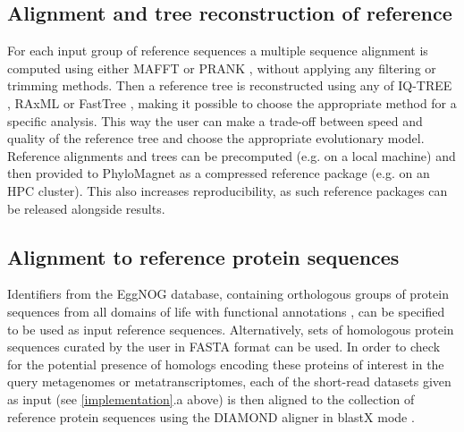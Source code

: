 \documentclass[a4paper]{article}
\begin{document}
\subsection{Alignment and tree reconstruction of reference}
For each input group of reference sequences a multiple sequence alignment is computed using either MAFFT \citep{Katoh2013} or PRANK \citep{Loytynoja2010}, without applying any filtering or trimming methods. Then a reference tree is reconstructed using any of IQ-TREE \citep{Nguyen2015}, RAxML \citep{Stamatakis2014} or FastTree \citep{Price2010}, making it possible to choose the appropriate method for a specific analysis. This way the user can make a trade-off between speed and quality of the reference tree and choose the appropriate evolutionary model. Reference alignments and trees can be precomputed (e.g. on a local machine) and then provided to PhyloMagnet as a compressed reference package (e.g. on an HPC cluster). This also increases reproducibility, as such reference packages can be released alongside results.

\subsection{Alignment to reference protein sequences}
Identifiers from the EggNOG database, containing orthologous groups of protein sequences from all domains of life with functional annotations \citep{Huerta-cepas2016b}, can be specified to be used as input reference sequences. Alternatively, sets of homologous protein sequences curated by the user in FASTA format can be used. In order to check for the potential presence of homologs encoding these proteins of interest in the query metagenomes or metatranscriptomes, each of the short-read datasets given as input (see \ref{implementation}.a above) is then aligned to the collection of reference protein sequences using the DIAMOND aligner in blastX mode \citep[Fig. \ref{fig:01}:2;][]{Buchfink2014}.
\end{document}
